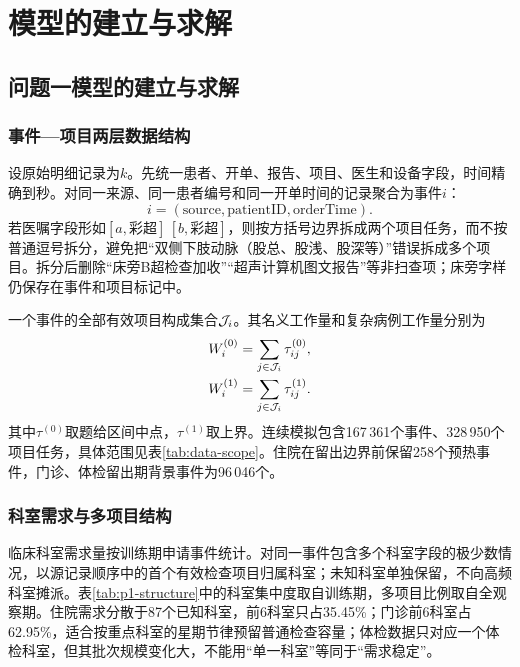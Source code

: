 \section{模型的建立与求解}

\subsection{问题一模型的建立与求解}

\subsubsection{事件—项目两层数据结构}

设原始明细记录为$k$。先统一患者、开单、报告、项目、医生和设备字段，时间精确到秒。对同一来源、同一患者编号和同一开单时间的记录聚合为事件$i$：
\begin{equation}
i=(\mathrm{source},\mathrm{patientID},\mathrm{orderTime}).
\end{equation}
若医嘱字段形如$[a,\text{彩超}]\,[b,\text{彩超}]$，则按方括号边界拆成两个项目任务，而不按普通逗号拆分，避免把“双侧下肢动脉（股总、股浅、股深等）”错误拆成多个项目。拆分后删除“床旁B超检查加收”“超声计算机图文报告”等非扫查项；床旁字样仍保存在事件和项目标记中。

一个事件的全部有效项目构成集合$\mathcal{J}_i$。其名义工作量和复杂病例工作量分别为
\begin{align}
W_i^{(0)}&=\sum_{j\in\mathcal{J}_i}\tau_{ij}^{(0)},\\
W_i^{(1)}&=\sum_{j\in\mathcal{J}_i}\tau_{ij}^{(1)}.
\end{align}
其中$\tau^{(0)}$取题给区间中点，$\tau^{(1)}$取上界。连续模拟包含167\,361个事件、328\,950个项目任务，具体范围见表\ref{tab:data-scope}。住院在留出边界前保留258个预热事件，门诊、体检留出期背景事件为96\,046个。

\begin{table}[H]
\centering
\caption{连续模拟与留出期数据规模}
\label{tab:data-scope}

\end{table}

\subsubsection{科室需求与多项目结构}

临床科室需求量按训练期申请事件统计。对同一事件包含多个科室字段的极少数情况，以源记录顺序中的首个有效检查项目归属科室；未知科室单独保留，不向高频科室摊派。表\ref{tab:p1-structure}中的科室集中度取自训练期，多项目比例取自全观察期。住院需求分散于87个已知科室，前6科室只占35.45\%；门诊前6科室占62.95\%，适合按重点科室的星期节律预留普通检查容量；体检数据只对应一个体检科室，但其批次规模变化大，不能用“单一科室”等同于“需求稳定”。

